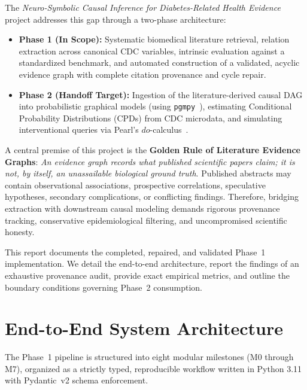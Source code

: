 \documentclass[11pt,a4paper]{article}
\begin{document}
The \textit{Neuro-Symbolic Causal Inference for Diabetes-Related Health Evidence} project addresses this gap through a two-phase architecture:
\begin{itemize}[leftmargin=1.8em]
    \item \textbf{Phase 1 (In Scope):} Systematic biomedical literature retrieval, relation extraction across canonical CDC variables, intrinsic evaluation against a standardized benchmark, and automated construction of a validated, acyclic evidence graph with complete citation provenance and cycle repair.
    \item \textbf{Phase 2 (Handoff Target):} Ingestion of the literature-derived causal DAG into probabilistic graphical models (using \texttt{pgmpy}~\cite{ankan2015pgmpy}), estimating Conditional Probability Distributions (CPDs) from CDC microdata, and simulating interventional queries via Pearl's $do$-calculus~\cite{pearl2018seven}.
\end{itemize}

A central premise of this project is the \textbf{Golden Rule of Literature Evidence Graphs}: \textit{An evidence graph records what published scientific papers claim; it is not, by itself, an unassailable biological ground truth}. Published abstracts may contain observational associations, prospective correlations, speculative hypotheses, secondary complications, or conflicting findings. Therefore, bridging extraction with downstream causal modeling demands rigorous provenance tracking, conservative epidemiological filtering, and uncompromised scientific honesty.

This report documents the completed, repaired, and validated Phase~1 implementation. We detail the end-to-end architecture, report the findings of an exhaustive provenance audit, provide exact empirical metrics, and outline the boundary conditions governing Phase~2 consumption.

\section{End-to-End System Architecture}
\label{sec:architecture}

The Phase~1 pipeline is structured into eight modular milestones (M0 through M7), organized as a strictly typed, reproducible workflow written in Python 3.11 with Pydantic~v2 schema enforcement.
\end{document}
